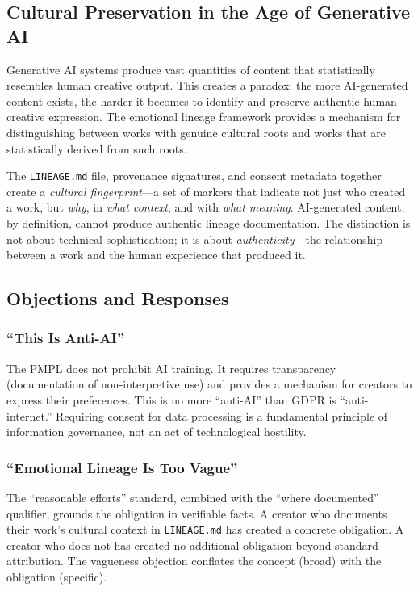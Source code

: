 \documentclass[11pt,twocolumn]{article}
\begin{document}
\subsection{Cultural Preservation in the Age of Generative AI}

Generative AI systems produce vast quantities of content that
statistically resembles human creative output. This creates a paradox:
the more AI-generated content exists, the harder it becomes to identify
and preserve authentic human creative expression. The emotional lineage
framework provides a mechanism for distinguishing between works with
genuine cultural roots and works that are statistically derived from
such roots.

The \texttt{LINEAGE.md} file, provenance signatures, and consent metadata
together create a \emph{cultural fingerprint}---a set of markers that
indicate not just who created a work, but \emph{why}, in \emph{what
context}, and with \emph{what meaning}. AI-generated content, by
definition, cannot produce authentic lineage documentation. The
distinction is not about technical sophistication; it is about
\emph{authenticity}---the relationship between a work and the human
experience that produced it.

\subsection{Objections and Responses}

\subsubsection{``This Is Anti-AI''}

The PMPL does not prohibit AI training. It requires transparency
(documentation of non-interpretive use) and provides a mechanism for
creators to express their preferences. This is no more ``anti-AI'' than
GDPR is ``anti-internet.'' Requiring consent for data processing is a
fundamental principle of information governance, not an act of
technological hostility.

\subsubsection{``Emotional Lineage Is Too Vague''}

The ``reasonable efforts'' standard, combined with the ``where
documented'' qualifier, grounds the obligation in verifiable facts. A
creator who documents their work's cultural context in
\texttt{LINEAGE.md} has created a concrete obligation. A creator who
does not has created no additional obligation beyond standard attribution.
The vagueness objection conflates the concept (broad) with the
obligation (specific).
\end{document}
